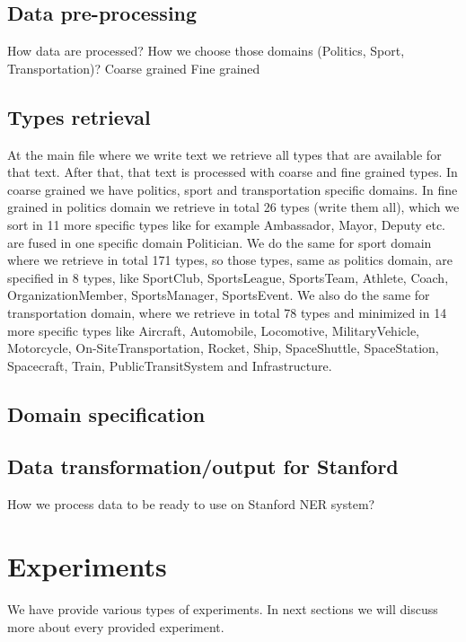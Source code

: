 \documentclass[thesis=M,english]{FITthesis}[2018/05/30]
\begin{document}
\section{Data pre-processing}
	How data are processed?
	How we choose those domains (Politics, Sport, Transportation)?
	Coarse grained
	Fine grained 

\section{Types retrieval}\label{}
At the main file where we write text we retrieve all types that are available for that text. After that, that text is processed with coarse and fine grained types. In coarse grained we have politics, sport and transportation specific domains. In fine grained in politics domain we retrieve in total 26 types (write them all), which we sort in 11 more specific types like for example Ambassador, Mayor, Deputy etc. are fused in one specific domain Politician. We do the same for sport domain where we retrieve in total 171 types, so those types, same as politics domain, are specified in 8 types, like SportClub, SportsLeague, SportsTeam, Athlete, Coach, OrganizationMember, SportsManager, SportsEvent. We also do the same for transportation domain, where we retrieve in total 78 types and minimized in 14 more specific types like Aircraft, Automobile, Locomotive, MilitaryVehicle, Motorcycle, On-SiteTransportation, Rocket, Ship, SpaceShuttle, SpaceStation, Spacecraft, Train, PublicTransitSystem and Infrastructure.  

\section{Domain specification}


\section{Data transformation/output for Stanford}
How we process data to be ready to use on Stanford NER system?



\chapter{Experiments}
We have provide various types of experiments. In next sections we will discuss more about every provided experiment.
\end{document}
